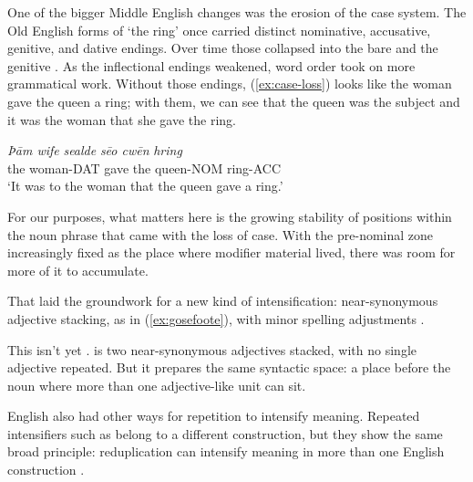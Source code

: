 One of the bigger Middle English changes was the erosion of the case system. The Old English forms of  `the ring' once carried distinct nominative, accusative, genitive, and dative endings. Over time those collapsed into the bare  and the genitive . As the inflectional endings weakened, word order took on more grammatical work. Without those endings, (\ref{ex:case-loss}) looks like the woman gave the queen a ring; with them, we can see that the queen was the subject and it was  the woman that she gave the ring.

\ea \label{ex:case-loss}
    \gll \textit{Þām wife} \textit{sealde} \textit{sēo cwēn} \textit{hring}\\
        {the woman-DAT} gave {the queen-NOM} ring-ACC\\
    \glt `It was to the woman that the queen gave a ring.'
\z

For our purposes, what matters here is the growing stability of positions within the noun phrase that came with the loss of case. With the pre-nominal zone increasingly fixed as the place where modifier material lived, there was room for more of it to accumulate.

That laid the groundwork for a new kind of intensification: near-synonymous adjective stacking, as in (\ref{ex:gosefoote}), with minor spelling adjustments \citep{Gonzalez-Diaz2021}.

\label{ex:gosefoote}
\z

This isn't yet .  is two near-synonymous adjectives stacked, with no single adjective repeated. But it prepares the same syntactic space: a place before the noun where more than one adjective-like unit can sit.

English also had other ways for repetition to intensify meaning. Repeated intensifiers such as  belong to a different construction, but they show the same broad principle: reduplication can intensify meaning in more than one English construction \citep{MendezNaya2017}.


